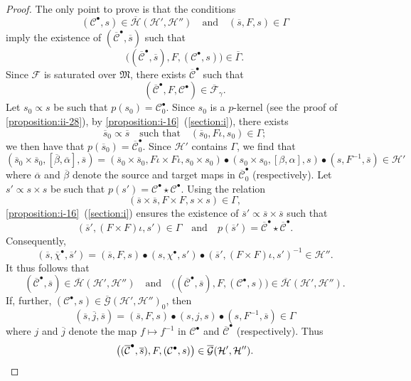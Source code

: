 \documentclass[a4paper,fleqn]{article}
\theoremstyle{plain}
\theoremstyle{definition}
\newcommand{\oldpage}[1]{{\marginpar{\footnotesize$\bigg\vert$\,\,\,\,\textit{p.~#1}}}}
\newcommand{\textand}{\quad\text{and}\quad}
\newcommand{\CC}{\mathcal{C}}
\newcommand{\HH}{\mathcal{H}}
\newcommand{\MM}{\mathfrak{M}}
\newcommand{\FF}{\mathcal{F}}
\newcommand{\subs}{\mathrel{\propto}}
\newcommand{\GG}{\mathcal{G}}
\begin{document}
\begin{proof}
  The only point to prove is that the conditions
  \[
    (\CC^\bullet,s)\in\overline{\HH}(\HH',\HH'')
    \textand
    (\overline{s},F,s)\in\Gamma
  \]
  imply the existence of $(\overline{\CC}^\bullet,\overline{s})$ such that
  \[
    \big((\overline{\CC}^\bullet,\overline{s}),F,(\CC^\bullet,s)\big)
    \in\overline{\Gamma}.
  \]
  Since $\FF$ is saturated over $\MM$, there exists $\overline{\CC}^\bullet$ such that
  \[
    (\overline{\CC}^\bullet,F,\CC^\bullet)
    \in\overline{\FF}_\gamma.
  \]
  \oldpage{413}
  Let $s_0\subs s$ be such that $p(s_0)=\CC_0^\bullet$.
  Since $s_0$ is a $p$-kernel (see the proof of \cref{proposition:ii-28}), by \cref{proposition:i-16}~(\cref{section:i}), there exists
  \[
    \overline{s}_0\subs\overline{s}
    \quad\text{such that}\quad
    (\overline{s}_0,F\iota,s_0)
    \in\Gamma;
  \]
  we then have that $p(\overline{s}_0)=\overline{\CC}_0^\bullet$.
  Since $\HH'$ contains $\Gamma$, we find that
  \[
    (\overline{s}_0\times\overline{s}_0,[\overline{\beta},\overline{\alpha}],\overline{s})
    = (\overline{s}_0\times\overline{s}_0,F\iota\times F\iota,s_0\times s_0)\bullet(s_0\times s_0,[\beta,\alpha],s)\bullet(s,F^{-1},\overline{s})
    \in\HH'
  \]
  where $\overline{\alpha}$ and $\overline{\beta}$ denote the source and target maps in $\overline{\CC}_0^\bullet$ (respectively).
  Let $s'\subs s\times s$ be such that $p(s')=\CC^\bullet\star\CC^\bullet$.
  Using the relation
  \[
    (\overline{s}\times\overline{s},F\times F,s\times s)
    \in\Gamma,
  \]
  \cref{proposition:i-16}~(\cref{section:i}) ensures the existence of $\overline{s}'\subs\overline{s}\times\overline{s}$ such that
  \[
    (\overline{s}',(F\times F)\iota,s')\in\Gamma
    \textand
    p(\overline{s}')=\overline{\CC}^\bullet\star\overline{\CC}^\bullet.
  \]
  Consequently,
  \[
    (\overline{s},\overline{\chi}^\bullet,\overline{s}')
    = (\overline{s},F,s)\bullet(s,\chi^\bullet,s')\bullet(\overline{s}',(F\times F)\iota,s')^{-1}
    \in\HH''.
  \]
  It thus follows that
  \[
    (\overline{\CC}^\bullet,\overline{s})\in\overline{\HH}(\HH',\HH'')
    \textand
    \big((\overline{\CC}^\bullet,\overline{s}),F,(\CC^\bullet,s)\big)\in\overline{\HH}(\HH',\HH'').
  \]
  If, further, $(\CC^\bullet,s)\in\overline{\GG}(\HH',\HH'')_0$, then
  \[
    (\overline{s},\overline{j},\overline{s})
    = (\overline{s},F,s)\bullet(s,j,s)\bullet(s,F^{-1},\overline{s})
    \in\Gamma
  \]
  where $j$ and $\overline{j}$ denote the map $f\mapsto f^{-1}$ in $\CC^\bullet$ and $\overline{\CC}^\bullet$ (respectively).
  Thus
  \[
    \big((\overline{\CC}^\bullet,\overline{s}),F,(\CC^\bullet,s)\big)
    \in\overline{\GG}(\HH',\HH'').
    \qedhere
  \]
\end{proof}
\end{document}
